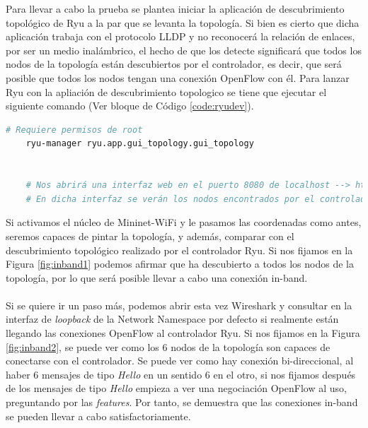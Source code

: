 Para llevar a cabo la prueba se plantea iniciar la aplicación de descubrimiento topológico de Ryu a la par que se levanta la topología. Si bien es cierto que dicha aplicación trabaja con el protocolo LLDP y no reconocerá la relación de enlaces, por ser un medio inalámbrico, el hecho de que los detecte significará que todos los nodos de la topología están descubiertos por el controlador, es decir, que será posible que todos los nodos tengan una conexión OpenFlow con él. Para lanzar Ryu con la apliación de descubrimiento topologico se tiene que ejecutar el siguiente comando (Ver bloque de Código \ref{code:ryudev}).


\begin{lstlisting}[language= bash, style=Consola, caption={Lanzamos el controlador de Ryu con la App de topo.discovery},label=code:ryudev]
    # Requiere permisos de root
    ryu-manager ryu.app.gui_topology.gui_topology


    # Nos abrirá una interfaz web en el puerto 8080 de localhost --> http://localhost:8080
    # En dicha interfaz se verán los nodos encontrados por el controlador
\end{lstlisting}
\vspace{0.5cm}

Si activamos el núcleo de Mininet-WiFi y le pasamos las coordenadas como antes, seremos capaces de pintar la topología, y además, comparar con el descubrimiento topológico realizado por el controlador Ryu. Si nos fijamos en la Figura \ref{fig:inband1} podemos afirmar que ha descubierto a todos los nodos de la topología, por lo que será posible llevar a cabo una conexión in-band.\\
\\
Si se quiere ir un paso más, podemos abrir esta vez Wireshark y consultar en la interfaz de \textit{loopback} de la Network Namespace por defecto si realmente están llegando las conexiones OpenFlow al controlador Ryu. Si nos fijamos en la Figura \ref{fig:inband2}, se puede ver como los 6 nodos de la topología son capaces de conectarse con el controlador. Se puede ver como hay conexión bi-direccional, al haber 6 mensajes de tipo \textit{Hello} en un sentido 6 en el otro, si nos fijamos después de los mensajes de tipo \textit{Hello} empieza a ver una negociación OpenFlow al uso, preguntando por las \textit{features}. Por tanto, se demuestra que las conexiones in-band se pueden llevar a cabo satisfactoriamente.\\

